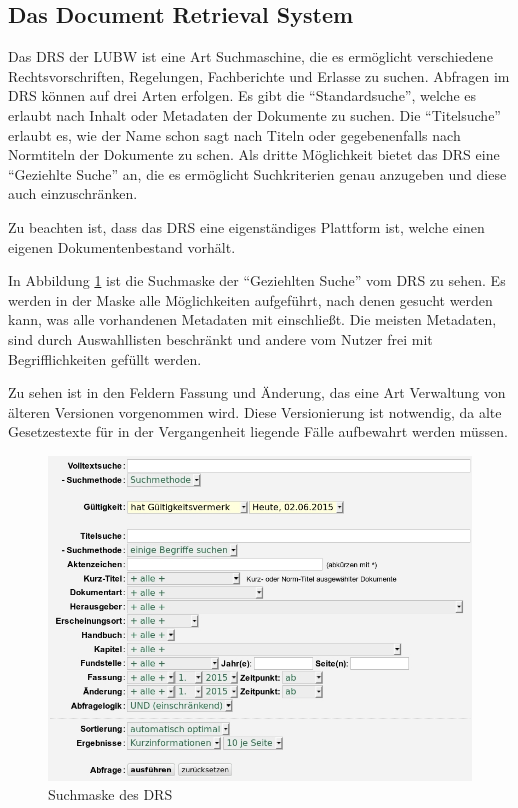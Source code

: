 \subsection{Das Document Retrieval System} \label{DRS}
Das \ac{DRS} der \ac{LUBW} ist eine Art Suchmaschine, die es erm\"oglicht verschiedene Rechtsvorschriften, Regelungen, Fachberichte und Erlasse zu suchen. Abfragen im \ac{DRS} k\"onnen auf drei Arten erfolgen. Es gibt die "`Standardsuche"', welche es erlaubt nach Inhalt oder Metadaten der Dokumente zu suchen. Die "`Titelsuche"' erlaubt es, wie der Name schon sagt nach Titeln oder gegebenenfalls nach Normtiteln der Dokumente zu schen. Als dritte M\"oglichkeit bietet das \ac{DRS} eine "`Geziehlte Suche"' an, die es erm\"oglicht Suchkriterien genau anzugeben und diese auch einzuschr\"anken.
\cite{DRS}

Zu beachten ist, dass das \ac{DRS} eine eigenst\"andiges Plattform ist, welche einen eigenen Dokumentenbestand vorh\"alt.

In Abbildung \ref{Suchmaske DRS} ist die Suchmaske der "`Geziehlten Suche"' vom \ac{DRS} zu sehen. Es werden in der Maske alle M\"oglichkeiten aufgef\"uhrt, nach denen gesucht werden kann, was alle vorhandenen Metadaten mit einschlie\ss{}t. Die meisten Metadaten, sind durch Auswahllisten beschr\"ankt und andere vom Nutzer frei mit Begrifflichkeiten gef\"ullt werden.

Zu sehen ist in den Feldern Fassung und \"Anderung, das eine Art Verwaltung von \"alteren Versionen vorgenommen wird. Diese Versionierung ist notwendig, da alte Gesetzestexte f\"ur in der Vergangenheit liegende F\"alle aufbewahrt werden m\"ussen.

\begin{figure}[!ht]
\centering
\includegraphics[width=15cm]{Bilder/Suchmaske_DRS.jpg}
\caption{Suchmaske des \ac{DRS}}
\label{Suchmaske DRS}
\centering
\end{figure}

